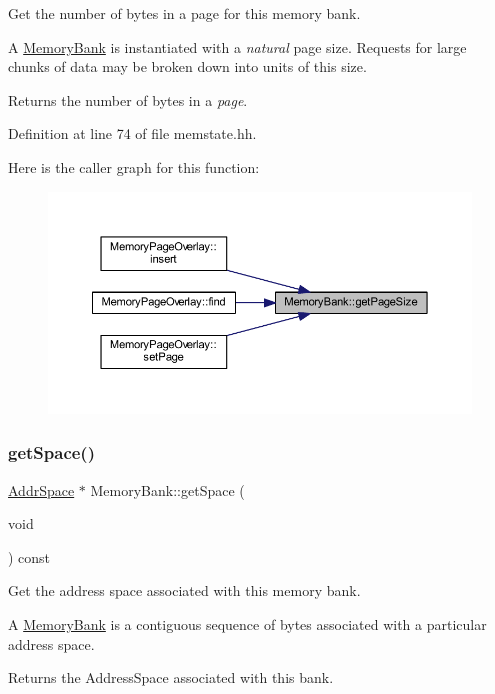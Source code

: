 Get the number of bytes in a page for this memory bank. 

A \mbox{\hyperlink{class_memory_bank}{Memory\+Bank}} is instantiated with a {\itshape natural} page size. Requests for large chunks of data may be broken down into units of this size. \begin{DoxyReturn}{Returns}
the number of bytes in a {\itshape page}. 
\end{DoxyReturn}


Definition at line 74 of file memstate.\+hh.

Here is the caller graph for this function\+:
\nopagebreak
\begin{figure}[H]
\begin{center}
\leavevmode
\includegraphics[width=350pt]{class_memory_bank_a020cac2b86f83b069c2f1914bc70cb2b_icgraph}
\end{center}
\end{figure}
\mbox{\label{class_memory_bank_a8e8f3ea79a07142e2d655eccf4ebc0f0}} 
\subsubsection{\texorpdfstring{getSpace()}{getSpace()}}
{\footnotesize\ttfamily \mbox{\hyperlink{class_addr_space}{Addr\+Space}} $\ast$ Memory\+Bank\+::get\+Space (\begin{DoxyParamCaption}\item[{void}]{ }\end{DoxyParamCaption}) const\hspace{0.3cm}{\ttfamily [inline]}}



Get the address space associated with this memory bank. 

A \mbox{\hyperlink{class_memory_bank}{Memory\+Bank}} is a contiguous sequence of bytes associated with a particular address space. \begin{DoxyReturn}{Returns}
the Address\+Space associated with this bank. 
\end{DoxyReturn}



